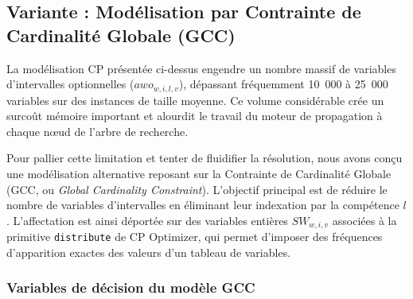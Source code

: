 \subsection{Variante : Modélisation par Contrainte de Cardinalité Globale (GCC)}

La modélisation CP présentée ci-dessus engendre un nombre massif de variables d'intervalles optionnelles ($awo_{w,i,l,v}$), dépassant fréquemment 10~000 à 25~000 variables sur des instances de taille moyenne. Ce volume considérable crée un surcoût mémoire important et alourdit le travail du moteur de propagation à chaque nœud de l'arbre de recherche.

\bigskip

Pour pallier cette limitation et tenter de fluidifier la résolution, nous avons conçu une modélisation alternative reposant sur la Contrainte de Cardinalité Globale (GCC, ou \textit{Global Cardinality Constraint}). L'objectif principal est de réduire le nombre de variables d'intervalles en éliminant leur indexation par la compétence $l$. L'affectation est ainsi déportée sur des variables entières $SW_{w,i,v}$ associées à la primitive \texttt{distribute} de CP Optimizer, qui permet d'imposer des fréquences d'apparition exactes des valeurs d'un tableau de variables.

\subsubsection{Variables de décision du modèle GCC}

